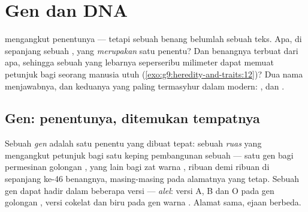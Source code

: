\chapter{Gen dan DNA}\label{ch:g9:genes-and-dna}

 mengangkut penentunya --- tetapi sebuah benang
belumlah sebuah teks. Apa, di sepanjang sebuah ,
yang \emph{merupakan} satu penentu? Dan benangnya terbuat
dari apa, sehingga sebuah  yang lebarnya seperseribu
milimeter dapat memuat petunjuk bagi seorang manusia utuh
(\cref{exo:g9:heredity-and-traits:12})? Dua nama
menjawabnya, dan keduanya yang paling termasyhur dalam
 modern: , dan .

\section{Gen: penentunya, ditemukan tempatnya}

\begin{definition}\label{def:g9:genes-and-dna:gene}
Sebuah \emph{gen} adalah satu penentu yang dibuat
tepat: sebuah \emph{ruas } yang mengangkut petunjuk
bagi satu keping pembangunan sebuah  --- satu gen bagi
permesinan golongan , yang lain bagi zat warna
, ribuan demi ribuan di sepanjang ke-46 benangnya,
masing-masing pada alamatnya yang tetap. Sebuah gen dapat
hadir dalam beberapa versi --- \emph{alel}:
versi A, B dan O pada gen golongan , versi cokelat
dan biru pada gen warna . Alamat sama, ejaan berbeda.
\end{definition}

